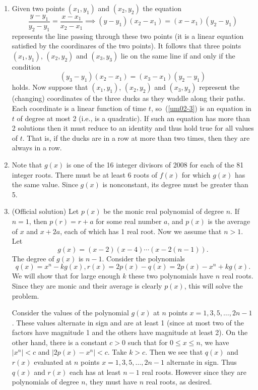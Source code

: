 \begin{enumerate}
\item 
Given two points $(x_1,y_1)$ and $(x_2,y_2)$ the equation 
\[\frac{y-y_1}{y_2-y_1}=\frac{x-x_1}{x_2-x_1} \implies
(y-y_1)(x_2-x_1)=(x-x_1)(y_2-y_1)\] represents the line passing through these two points (it is a linear equation satisfied by the coordinares of the two points). It follows that three points $(x_1,y_1)$, $(x_2,y_2)$ and $(x_3,y_3)$ lie on the same line if and only if the condition 
\begin{equation}(y_3-y_1)(x_2-x_1)= (x_3-x_1)(y_2-y_1) 
\label{um02-3}
\end{equation}
holds. Now suppose that $(x_1,y_1)$, $(x_2,y_2)$ and $(x_3,y_3)$ represent the (changing) coordinates of the three ducks as they waddle along their paths. Each coordinate is a linear function of time $t$, so~(\ref{um02-3}) is an equation in $t$ of degree at most 2 (i.e., is a quadratic). If such an equation has more than 2 solutions then it must reduce to an identity and thus hold true for all values of $t$. That is, if the ducks are in a row at more than two times, then they are always in a row. 

\item Note that $g(x)$ is one of the 16 integer divisors of 2008 for each of the 81 integer roots. There must be at least 6 roots of $f(x)$ for which $g(x)$ has the same value. Since $g(x)$ is nonconstant, its degree must be greater than 5.

\item (Official solution) Let $p(x)$ be the monic real polynomial of degree $n$. If $n=1$, then $p(r)=r+a$ for some real number $a$, and $p(x)$ is the average of $x$ and $x+2a$, each of which has 1 real root. Now we assume that $n>1$. Let
\[g(x)=(x-2)(x-4)\cdots (x-2(n-1)).\]
The degree of $g(x)$ is $n-1$. Consider the polynomials
\[q(x)=x^n-kg(x), r(x)=2p(x)-q(x)=2p(x)-x^n+kg(x).\]
We will show that for large enough $k$ these two polynomials have $n$ real roots. Since they are monic and their average is clearly $p(x)$, this will solve the problem.

Consider the values of the polynomial $g(x)$ at $n$ points $x=1,3,5,\ldots, 2n-1$. These values alternate in sign and are at least 1 (since at most two of the factors have magnitude 1 and the others have magnitude at least 2). On the other hand, there is a constant $c>0$ such that for $0\leq x\leq n$, we have $|x^n|<c$ and $|2p(x)-x^n|<c$. Take $k>c$. Then we see that $q(x)$ and $r(x)$ evaluated at $n$ points $x=1,3,5,\ldots, 2n-1$ alternate in sign. Thus $q(x)$ and $r(x)$ each has at least $n-1$ real roots. However since they are polynomials of degree $n$, they must have $n$ real roots, as desired.


\end{enumerate}

